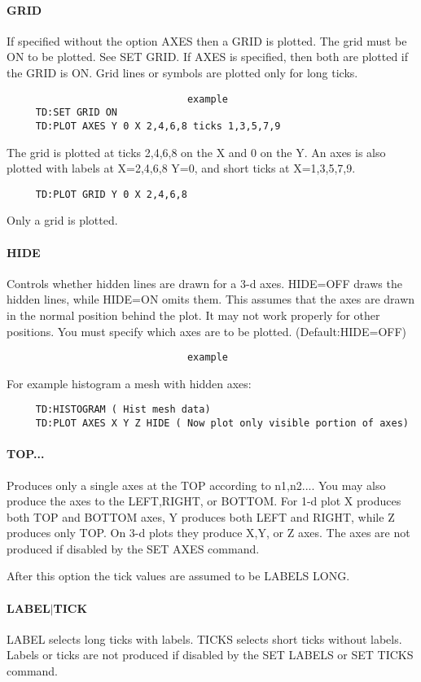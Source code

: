 \paragraph{GRID}
If  specified  without  the  option AXES then a GRID is plotted.  The
grid must be ON to be plotted.  See SET GRID.  If AXES is  specified,
then  both  are plotted if the GRID is ON.  Grid lines or symbols are
plotted only for long ticks.  

\begin{verbatim}
                               example
     TD:SET GRID ON 
     TD:PLOT AXES Y 0 X 2,4,6,8 ticks 1,3,5,7,9 
\end{verbatim}
The  grid  is  plotted  at ticks 2,4,6,8 on the X and 0 on the Y.  An
axes is also plotted with labels at X=2,4,6,8 Y=0, and short ticks at
X=1,3,5,7,9.  
\begin{verbatim}
     TD:PLOT GRID Y 0 X 2,4,6,8 
\end{verbatim}
Only a grid is plotted.  
\paragraph{HIDE}
Controls  whether  hidden  lines  are drawn for a 3-d axes.  HIDE=OFF
draws the hidden lines, while HIDE=ON omits them.  This assumes  that
the  axes  are  drawn in the normal position behind the plot.  It may
not work properly for other positions.  You must specify  which  axes
are to be plotted.  
(Default:HIDE=OFF) 
\begin{verbatim}
                               example
\end{verbatim}
For example histogram a mesh with hidden axes:  
\begin{verbatim}
     TD:HISTOGRAM ( Hist mesh data) 
     TD:PLOT AXES X Y Z HIDE ( Now plot only visible portion of axes) 
\end{verbatim}
\paragraph{TOP...}
Produces  only  a  single axes at the TOP according to n1,n2....  You
may also produce the axes to the LEFT,RIGHT, or BOTTOM.  For 1-d plot
X  produces both TOP and BOTTOM axes, Y produces both LEFT and RIGHT,
while Z produces only TOP.  On 3-d plots they produce X,Y, or Z axes.
The axes are not produced if disabled by the SET AXES command.  

After this option the tick values are assumed to be LABELS LONG.  
\paragraph{LABEL$|$TICK}
LABEL  selects  long  ticks  with  labels.  TICKS selects short ticks
without labels.  Labels or ticks are not produced if disabled by  the
SET LABELS or SET TICKS command.  
